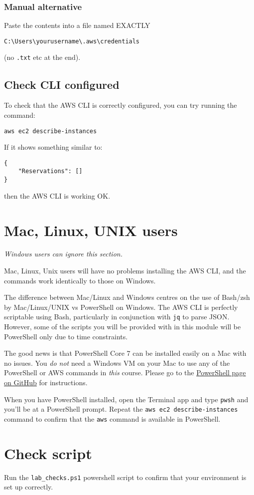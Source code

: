 \documentclass{pgnotes}
\begin{document}
\subsubsection{Manual alternative}

Paste the contents into a file named EXACTLY 
\begin{verbatim}
C:\Users\yourusername\.aws\credentials
\end{verbatim}
(no \texttt{.txt} etc at the end). 

\subsection{Check CLI configured}

To check that the AWS CLI is correctly configured, you can try running the command:
\begin{verbatim}
aws ec2 describe-instances
\end{verbatim}
If it shows something similar to:
\begin{verbatim}
{
    "Reservations": []
}
\end{verbatim}
then the AWS CLI is working OK.

\section{Mac, Linux, UNIX users}

\textit{Windows users can ignore this section.}

Mac, Linux, Unix users will have no problems installing the AWS CLI, and the commands work identically to those on Windows.

The difference between Mac/Linux and Windows centres on the use of Bash/zsh by Mac/Linux/UNIX vs PowerShell on Windows.
The AWS CLI is perfectly scriptable using Bash, particularly in conjunction with \texttt{jq} to parse JSON.
However, some of the scripts you will be provided with in this module will be PowerShell only due to time constraints.

The good news is that PowerShell Core 7 can be installed easily on a Mac with no issues.
You \textit{do not} need a Windows VM on your Mac to use any of the PowerShell or AWS commands in \textit{this} course.
Please go to the \href{https://github.com/PowerShell/PowerShell}{PowerShell page on GitHub} for instructions.

When you have PowerShell installed, open the Terminal app and type \texttt{pwsh} and you'll be at a PowerShell prompt.
Repeat the \texttt{aws ec2 describe-instances} command to confirm that the \texttt{aws} command is available in PowerShell. 

\section{Check script}

Run the \texttt{lab\_checks.ps1} powershell script to confirm that your environment is set up correctly. 
\end{document}
